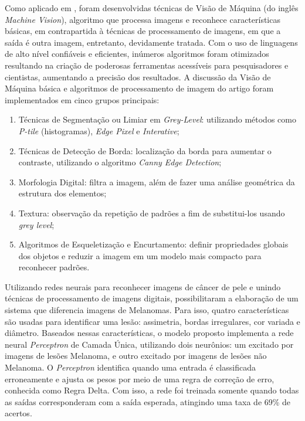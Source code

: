 Como aplicado em , foram desenvolvidas técnicas de Visão de Máquina (do inglês \textit{Machine Vision}), algoritmo que processa imagens e reconhece características básicas, em contrapartida à técnicas de processamento de imagens, em que a saída é outra imagem, entretanto, devidamente tratada. Com o uso de linguagens de alto nível confiáveis e eficientes, inúmeros algoritmos foram otimizados resultando na criação de poderosas ferramentas acessíveis para pesquisadores e cientistas, aumentando a precisão dos resultados. A discussão da Visão de Máquina básica e algoritmos de processamento de imagem do artigo foram implementados em cinco grupos principais: 
\begin{enumerate}
  \renewcommand{\labelenumi}{\alph{enumi})}
    \item Técnicas de Segmentação ou Limiar em \textit{Grey-Level}: utilizando métodos como \textit{P-tile} (histogramas), \textit{Edge Pixel} e \textit{Interative};
    
    \item Técnicas de Detecção de Borda: localização da borda para aumentar o contraste, utilizando o algoritmo \textit{Canny Edge Detection};
    
    \item Morfologia Digital: filtra a imagem, além de fazer uma análise geométrica da estrutura dos elementos;
    
    \item Textura: observação da repetição de padrões a fim de substitui-los usando \textit{grey level};
    
    \item Algoritmos de Esqueletização e Encurtamento: definir propriedades globais dos objetos e reduzir a imagem em um modelo mais compacto para reconhecer padrões.
\end{enumerate}


Utilizando redes neurais para reconhecer imagens de câncer de pele e unindo técnicas de processamento de imagens digitais,  possibilitaram a elaboração de um sistema que diferencia imagens de Melanomas. Para isso, quatro características são usadas para identificar uma lesão: assimetria, bordas irregulares, cor variada e diâmetro. Baseados nessas características, o modelo proposto implementa a rede neural \textit{Perceptron} de Camada Única, utilizando dois neurônios: um excitado por imagens de lesões Melanoma, e outro excitado por imagens de lesões não Melanoma. O \textit{Perceptron} identifica quando uma entrada é classificada erroneamente e ajusta os pesos por meio de uma regra de correção de erro, conhecida como Regra Delta. Com isso, a rede foi treinada somente quando todas as saídas corresponderam com a saída esperada, atingindo uma taxa de 69\% de acertos.

